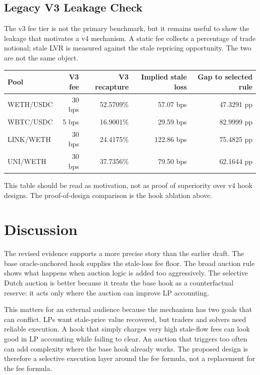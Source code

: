 \documentclass[11pt]{article}
\begin{document}
\subsection{Legacy V3 Leakage Check}
The v3 fee tier is not the primary benchmark, but it remains useful to show the leakage that motivates a v4 mechanism. A static fee collects a percentage of trade notional; stale LVR is measured against the stale repricing opportunity. The two are not the same object.

\begin{center}
\begin{tabular}{lrrrr}
\toprule
Pool & V3 fee & V3 recapture & Implied stale loss & Gap to selected rule \\
\midrule
WETH/USDC & 30 bps & 52.5709\% & 57.07 bps & 47.3291 pp \\
WBTC/USDC & 5 bps & 16.9001\% & 29.59 bps & 82.9999 pp \\
LINK/WETH & 30 bps & 24.4175\% & 122.86 bps & 75.4825 pp \\
UNI/WETH & 30 bps & 37.7356\% & 79.50 bps & 62.1644 pp \\
\bottomrule
\end{tabular}
\end{center}
This table should be read as motivation, not as proof of superiority over v4 hook designs. The proof-of-design comparison is the hook ablation above.

\section{Discussion}
The revised evidence supports a more precise story than the earlier draft. The base oracle-anchored hook supplies the stale-loss fee floor. The broad auction rule shows what happens when auction logic is added too aggressively. The selective Dutch auction is better because it treats the base hook as a counterfactual reserve: it acts only where the auction can improve LP accounting.

This matters for an external audience because the mechanism has two goals that can conflict. LPs want stale-price value recovered, but traders and solvers need reliable execution. A hook that simply charges very high stale-flow fees can look good in LP accounting while failing to clear. An auction that triggers too often can add complexity where the base hook already works. The proposed design is therefore a selective execution layer around the fee formula, not a replacement for the fee formula.
\end{document}
